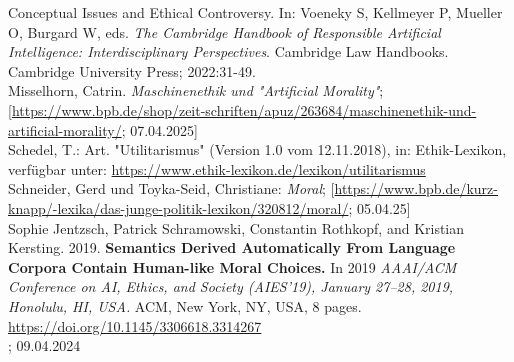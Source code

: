 Conceptual Issues and Ethical Controversy.
In: Voeneky S, Kellmeyer P, Mueller O, Burgard W, eds.
\textit{The Cambridge Handbook of Responsible Artificial Intelligence: Interdisciplinary Perspectives}.
Cambridge Law Handbooks.
Cambridge University Press; 2022:31-49. \\
\newline
Misselhorn, Catrin.
\textit{Maschinenethik und "Artificial Morality"};
[\href{https://www.bpb.de/shop/zeitschriften/apuz/263684/maschinenethik-und-artificial-morality/}{https://www.bpb.de/shop/zeit-schriften/apuz/263684/maschinenethik-und-artificial-morality/};
07.04.2025] \\
\newline
Schedel, T.: Art.
"Utilitarismus" (Version 1.0 vom 12.11.2018), in: Ethik-Lexikon, verfügbar
unter: \href{https://www.ethik-lexikon.de/lexikon/utilitarismus}{https://www.ethik-lexikon.de/lexikon/utilitarismus} \\
\newline
Schneider, Gerd und Toyka-Seid, Christiane:
\textit{Moral};
[\href{https://www.bpb.de/kurz-knapp/lexika/das-junge-politik-lexikon/320812/moral/}{https://www.bpb.de/kurz-knapp/-lexika/das-junge-politik-lexikon/320812/moral/};
05.04.25] \\
\newline
Sophie Jentzsch, Patrick Schramowski, Constantin Rothkopf, and Kristian
Kersting. 2019.
\textbf{Semantics Derived Automatically From Language Corpora
Contain Human-like Moral Choices.}
In 2019 \textit{AAAI/ACM Conference on AI,
Ethics, and Society (AIES’19), January 27–28, 2019, Honolulu, HI, USA.} ACM,
New York, NY, USA, 8 pages. \\
\href{https://doi.org/10.1145/3306618.3314267}{https://doi.org/10.1145/3306618.3314267} \\
; 09.04.2024 \\







